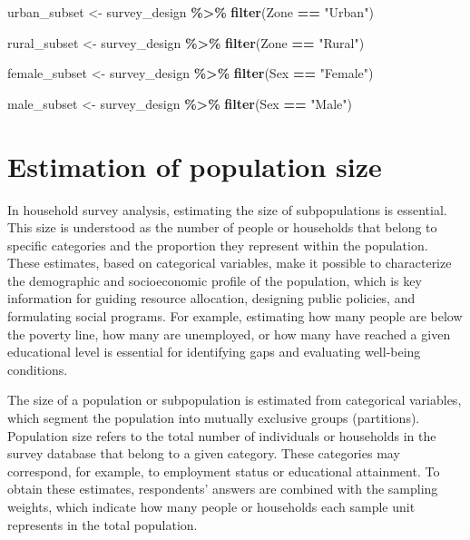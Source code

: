 \documentclass[
  english,
  12pt,
]{book}
\newenvironment{Shaded}{\begin{snugshade}}{\end{snugshade}}
\newcommand{\FunctionTok}[1]{\textcolor[rgb]{0.13,0.29,0.53}{\textbf{#1}}}
\newcommand{\NormalTok}[1]{#1}
\newcommand{\OtherTok}[1]{\textcolor[rgb]{0.56,0.35,0.01}{#1}}
\newcommand{\SpecialCharTok}[1]{\textcolor[rgb]{0.81,0.36,0.00}{\textbf{#1}}}
\newcommand{\StringTok}[1]{\textcolor[rgb]{0.31,0.60,0.02}{#1}}
\begin{document}
\begin{Shaded}
\begin{Highlighting}[]
\NormalTok{urban\_subset }\OtherTok{\textless{}{-}}\NormalTok{ survey\_design }\SpecialCharTok{\%\textgreater{}\%}
  \FunctionTok{filter}\NormalTok{(Zone }\SpecialCharTok{==} \StringTok{"Urban"}\NormalTok{)}

\NormalTok{rural\_subset }\OtherTok{\textless{}{-}}\NormalTok{ survey\_design }\SpecialCharTok{\%\textgreater{}\%}
  \FunctionTok{filter}\NormalTok{(Zone }\SpecialCharTok{==} \StringTok{"Rural"}\NormalTok{)}

\NormalTok{female\_subset }\OtherTok{\textless{}{-}}\NormalTok{ survey\_design }\SpecialCharTok{\%\textgreater{}\%}
  \FunctionTok{filter}\NormalTok{(Sex }\SpecialCharTok{==} \StringTok{"Female"}\NormalTok{)}

\NormalTok{male\_subset }\OtherTok{\textless{}{-}}\NormalTok{ survey\_design }\SpecialCharTok{\%\textgreater{}\%}
  \FunctionTok{filter}\NormalTok{(Sex }\SpecialCharTok{==} \StringTok{"Male"}\NormalTok{)}
\end{Highlighting}
\end{Shaded}

\section{Estimation of population size}\label{estimacion-del-tamano-poblacional}

In household survey analysis, estimating the size of subpopulations is essential. This size is understood as the number of people or households that belong to specific categories and the proportion they represent within the population. These estimates, based on categorical variables, make it possible to characterize the demographic and socioeconomic profile of the population, which is key information for guiding resource allocation, designing public policies, and formulating social programs. For example, estimating how many people are below the poverty line, how many are unemployed, or how many have reached a given educational level is essential for identifying gaps and evaluating well-being conditions.

The size of a population or subpopulation is estimated from categorical variables, which segment the population into mutually exclusive groups (partitions). Population size refers to the total number of individuals or households in the survey database that belong to a given category. These categories may correspond, for example, to employment status or educational attainment. To obtain these estimates, respondents' answers are combined with the sampling weights, which indicate how many people or households each sample unit represents in the total population.
\end{document}
